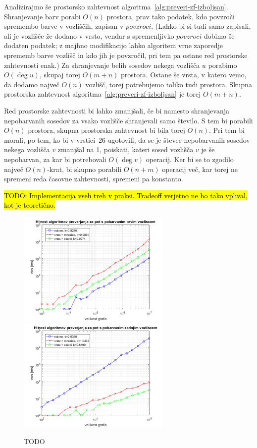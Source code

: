 \documentclass[12pt,a4paper,twoside]{article}
\theoremstyle{definition} %
\theoremstyle{plain} %
\numberwithin{equation}{section}  %
\begin{document}
Analizirajmo še prostorsko zahtevnost algoritma~\ref{alg:preveri-zf-izboljsan}. Shranjevanje barv porabi $O(n)$ prostora, prav tako podatek, kdo povzroči spremembo barve v vozliščih, zapisan v $povzroci$. (Lahko bi si tudi samo zapisali, ali je vozlišče že dodano v vrsto, vendar s spremenljivko $povzroci$ dobimo še dodaten podatek; z majhno modifikacijo lahko algoritem vrne zaporedje sprememb barve vozlišč in kdo jih je povzročil, pri tem pa ostane red prostorske zahtevnosti enak.) Za shranjevanje belih sosedov nekega vozlišča $u$ porabimo $O(\deg u)$, skupaj torej $O(m+n)$ prostora. Ostane še vrsta, v katero vemo, da dodamo največ $O(n)$ vozlišč, torej potrebujemo toliko tudi prostora. Skupna prostorska zahtevnost algoritma~\ref{alg:preveri-zf-izboljsan} je torej $O(m+n)$.

Red prostorske zahtevnosti bi lahko zmanjšali, če bi namesto shranjevanja nepobarvanih sosedov za vsako vozlišče shranjevali samo število. S tem bi porabili $O(n)$ prostora, skupna prostorska zahtevnost bi bila torej $O(n)$. Pri tem bi morali, po tem, ko bi v vrstici~26 ugotovili, da se je števec nepobarvanih sosedov nekega vozlišča $v$ zmanjšal na 1, poiskati, kateri sosed vozlišča $v$ je še nepobarvan, za kar bi potrebovali $O(\deg v)$ operacij. Ker bi se to zgodilo največ $O(n)$-krat, bi skupno porabili $O(n+m)$ operacij več, kar torej ne spremeni reda časovne zahtevnosti, spremeni pa konstanto.

\hl{TODO: Implementacija vseh treh v praksi. Tradeoff verjetno ne bo tako vplival, kot je teoretično.}

\begin{figure}[h]
    \centering
    \includegraphics[width=210pt]{koda/results/plots/pot_prvo_vozlisce.png}
    \includegraphics[width=210pt]{koda/results/plots/pot_zadnje_vozlisce.png}
    \caption{TODO}
\end{figure}
\end{document}
